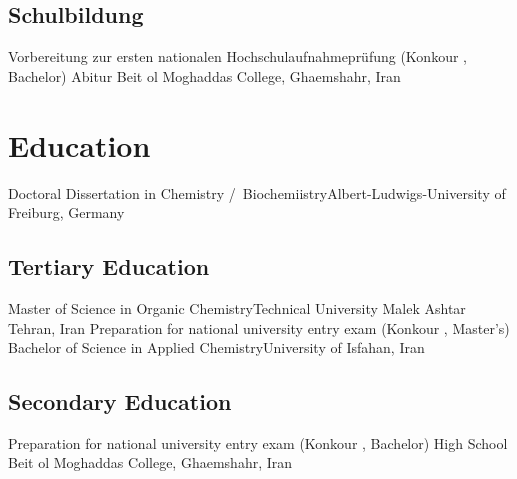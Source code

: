 {  \subsection{Schulbildung}
   {Vorbereitung zur ersten nationalen Hochschulaufnahmeprüfung (Konkour , Bachelor)}{}{}{}{}
   {Abitur}{
  }{Beit ol Moghaddas College, Ghaemshahr, Iran}{}{}{}


}{
  \section{Education}

   {Doctoral Dissertation in Chemistry \slash  ~Biochemiistry}{Albert-Ludwigs-University of Freiburg, Germany}{}{}{}






  \pagebreak
  \subsection{Tertiary Education}
   {Master of Science in Organic Chemistry}{Technical University Malek Ashtar Tehran, Iran}{}{}{}
   {Preparation for national university entry exam (Konkour , Master's)}{}{}{}{}
   {Bachelor of Science in Applied Chemistry}{University of Isfahan, Iran}{}{}{}

  \subsection{Secondary Education}
   {Preparation for national university entry exam (Konkour , Bachelor)}{}{}{}{}
   {High School}
  {}{Beit ol Moghaddas College, Ghaemshahr, Iran}{}{}{}
 
}